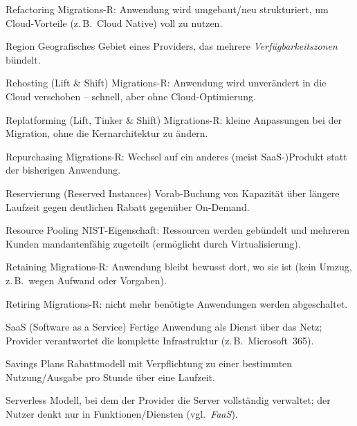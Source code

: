 \begin{glossar}
  \item[Refactoring] Migrations-R: Anwendung wird umgebaut/neu strukturiert,
        um Cloud-Vorteile (z.\,B.\ Cloud Native) voll zu nutzen.

  \item[Region] Geografisches Gebiet eines Providers, das mehrere
        \emph{Verfügbarkeitszonen} bündelt.

  \item[Rehosting (Lift \& Shift)] Migrations-R: Anwendung wird unverändert
        in die Cloud verschoben -- schnell, aber ohne Cloud-Optimierung.

  \item[Replatforming (Lift, Tinker \& Shift)] Migrations-R: kleine Anpassungen
        bei der Migration, ohne die Kernarchitektur zu ändern.

  \item[Repurchasing] Migrations-R: Wechsel auf ein anderes (meist SaaS-)Produkt
        statt der bisherigen Anwendung.

  \item[Reservierung (Reserved Instances)] Vorab-Buchung von Kapazität über
        längere Laufzeit gegen deutlichen Rabatt gegenüber On-Demand.

  \item[Resource Pooling] NIST-Eigenschaft: Ressourcen werden gebündelt und
        mehreren Kunden mandantenfähig zugeteilt (ermöglicht durch Virtualisierung).

  \item[Retaining] Migrations-R: Anwendung bleibt bewusst dort, wo sie ist
        (kein Umzug, z.\,B.\ wegen Aufwand oder Vorgaben).

  \item[Retiring] Migrations-R: nicht mehr benötigte Anwendungen werden
        abgeschaltet.

  \item[SaaS (Software as a Service)] Fertige Anwendung als Dienst über das Netz;
        Provider verantwortet die komplette Infrastruktur (z.\,B.\ Microsoft~365).

  \item[Savings Plans] Rabattmodell mit Verpflichtung zu einer bestimmten
        Nutzung/Ausgabe pro Stunde über eine Laufzeit.

  \item[Serverless] Modell, bei dem der Provider die Server vollständig
        verwaltet; der Nutzer denkt nur in Funktionen/Diensten (vgl.\ \emph{FaaS}).


\end{glossar}
